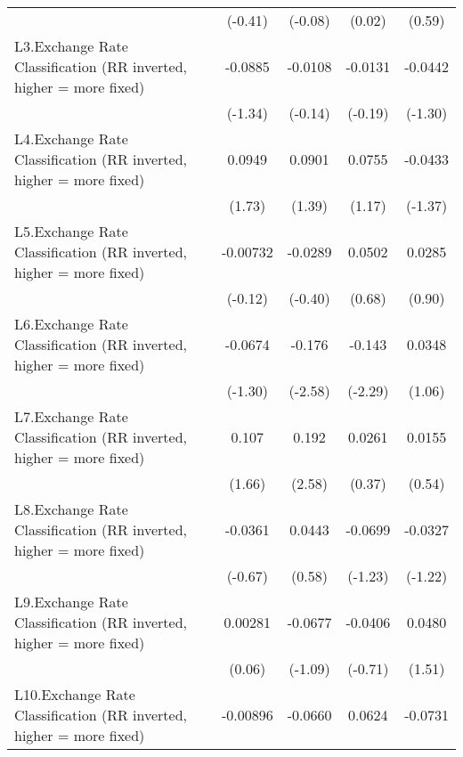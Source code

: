 {\begin{tabular}{l*{4}{c}}
                &  (-0.41)         &  (-0.08)         &   (0.02)         &   (0.59)         \\
[1em]
L3.Exchange Rate Classification (RR inverted, higher = more fixed)&  -0.0885         &  -0.0108         &  -0.0131         &  -0.0442         \\
                &  (-1.34)         &  (-0.14)         &  (-0.19)         &  (-1.30)         \\
[1em]
L4.Exchange Rate Classification (RR inverted, higher = more fixed)&   0.0949         &   0.0901         &   0.0755         &  -0.0433         \\
                &   (1.73)         &   (1.39)         &   (1.17)         &  (-1.37)         \\
[1em]
L5.Exchange Rate Classification (RR inverted, higher = more fixed)& -0.00732         &  -0.0289         &   0.0502         &   0.0285         \\
                &  (-0.12)         &  (-0.40)         &   (0.68)         &   (0.90)         \\
[1em]
L6.Exchange Rate Classification (RR inverted, higher = more fixed)&  -0.0674         &   -0.176\sym{**} &   -0.143\sym{*}  &   0.0348         \\
                &  (-1.30)         &  (-2.58)         &  (-2.29)         &   (1.06)         \\
[1em]
L7.Exchange Rate Classification (RR inverted, higher = more fixed)&    0.107         &    0.192\sym{**} &   0.0261         &   0.0155         \\
                &   (1.66)         &   (2.58)         &   (0.37)         &   (0.54)         \\
[1em]
L8.Exchange Rate Classification (RR inverted, higher = more fixed)&  -0.0361         &   0.0443         &  -0.0699         &  -0.0327         \\
                &  (-0.67)         &   (0.58)         &  (-1.23)         &  (-1.22)         \\
[1em]
L9.Exchange Rate Classification (RR inverted, higher = more fixed)&  0.00281         &  -0.0677         &  -0.0406         &   0.0480         \\
                &   (0.06)         &  (-1.09)         &  (-0.71)         &   (1.51)         \\
[1em]
L10.Exchange Rate Classification (RR inverted, higher = more fixed)& -0.00896         &  -0.0660         &   0.0624         &  -0.0731         \\

\end{tabular}}
